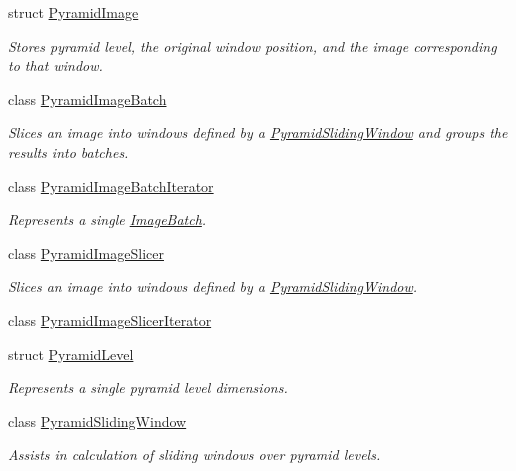 \begin{DoxyCompactItemize}
struct \hyperlink{structdg_1_1deepcore_1_1imagery_1_1_pyramid_image}{Pyramid\+Image}
\begin{DoxyCompactList}\small\item\em Stores pyramid level, the original window position, and the image corresponding to that window. \end{DoxyCompactList}\item 
class \hyperlink{classdg_1_1deepcore_1_1imagery_1_1_pyramid_image_batch}{Pyramid\+Image\+Batch}
\begin{DoxyCompactList}\small\item\em Slices an image into windows defined by a \hyperlink{classdg_1_1deepcore_1_1imagery_1_1_pyramid_sliding_window}{Pyramid\+Sliding\+Window} and groups the results into batches. \end{DoxyCompactList}\item 
class \hyperlink{classdg_1_1deepcore_1_1imagery_1_1_pyramid_image_batch_iterator}{Pyramid\+Image\+Batch\+Iterator}
\begin{DoxyCompactList}\small\item\em Represents a single \hyperlink{structdg_1_1deepcore_1_1imagery_1_1_image_batch}{Image\+Batch}. \end{DoxyCompactList}\item 
class \hyperlink{classdg_1_1deepcore_1_1imagery_1_1_pyramid_image_slicer}{Pyramid\+Image\+Slicer}
\begin{DoxyCompactList}\small\item\em Slices an image into windows defined by a \hyperlink{classdg_1_1deepcore_1_1imagery_1_1_pyramid_sliding_window}{Pyramid\+Sliding\+Window}. \end{DoxyCompactList}\item 
class \hyperlink{classdg_1_1deepcore_1_1imagery_1_1_pyramid_image_slicer_iterator}{Pyramid\+Image\+Slicer\+Iterator}
\item 
struct \hyperlink{structdg_1_1deepcore_1_1imagery_1_1_pyramid_level}{Pyramid\+Level}
\begin{DoxyCompactList}\small\item\em Represents a single pyramid level dimensions. \end{DoxyCompactList}\item 
class \hyperlink{classdg_1_1deepcore_1_1imagery_1_1_pyramid_sliding_window}{Pyramid\+Sliding\+Window}
\begin{DoxyCompactList}\small\item\em Assists in calculation of sliding windows over pyramid levels. \end{DoxyCompactList}\item 

\end{DoxyCompactItemize}
